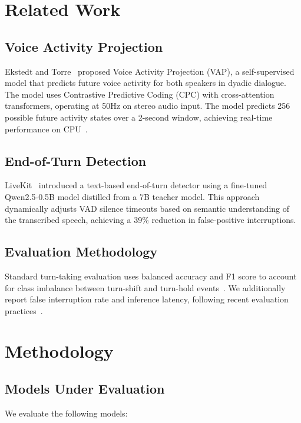 \documentclass[conference]{IEEEtran}
\begin{document}
\section{Related Work}

\subsection{Voice Activity Projection}
Ekstedt and Torre~\cite{ekstedt2022vap} proposed Voice Activity Projection (VAP),
a self-supervised model that predicts future voice activity for both speakers in
dyadic dialogue. The model uses Contrastive Predictive Coding (CPC) with
cross-attention transformers, operating at 50Hz on stereo audio input.
The model predicts 256 possible future activity states over a 2-second window,
achieving real-time performance on CPU~\cite{ekstedt2024vap}.

\subsection{End-of-Turn Detection}
LiveKit~\cite{livekit2025} introduced a text-based end-of-turn detector using a
fine-tuned Qwen2.5-0.5B model distilled from a 7B teacher model. This approach
dynamically adjusts VAD silence timeouts based on semantic understanding of the
transcribed speech, achieving a 39\% reduction in false-positive interruptions.

\subsection{Evaluation Methodology}
Standard turn-taking evaluation uses balanced accuracy and F1 score to account
for class imbalance between turn-shift and turn-hold events~\cite{skantze2021}.
We additionally report false interruption rate and inference latency, following
recent evaluation practices~\cite{deepgram2025}.

\section{Methodology}

\subsection{Models Under Evaluation}
We evaluate the following models:
\end{document}
